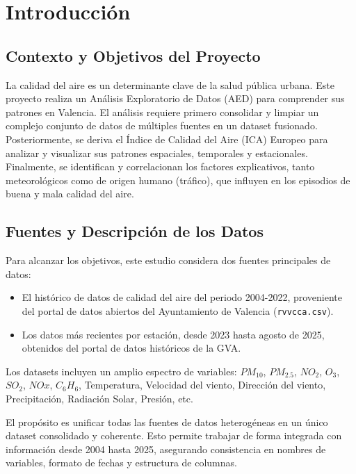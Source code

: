 \documentclass[,,,moreauthors,pdftex]{Definitions/mdpi}
\begin{document}

\section{Introducción}\label{introducciuxf3n}

\subsection{Contexto y Objetivos del
Proyecto}\label{contexto-y-objetivos-del-proyecto}

La calidad del aire es un determinante clave de la salud pública urbana.
Este proyecto realiza un Análisis Exploratorio de Datos (AED) para
comprender sus patrones en Valencia. El análisis requiere primero
consolidar y limpiar un complejo conjunto de datos de múltiples fuentes
en un dataset fusionado. Posteriormente, se deriva el Índice de Calidad
del Aire (ICA) Europeo para analizar y visualizar sus patrones
espaciales, temporales y estacionales. Finalmente, se identifican y
correlacionan los factores explicativos, tanto meteorológicos como de
origen humano (tráfico), que influyen en los episodios de buena y mala
calidad del aire.

\subsection{Fuentes y Descripción de los
Datos}\label{fuentes-y-descripciuxf3n-de-los-datos}

Para alcanzar los objetivos, este estudio considera dos fuentes
principales de datos:

\begin{itemize}
\item
  El histórico de datos de calidad del aire del periodo 2004-2022,
  proveniente del portal de datos abiertos del Ayuntamiento de Valencia
  (\texttt{rvvcca.csv}).
\item
  Los datos más recientes por estación, desde 2023 hasta agosto de 2025,
  obtenidos del portal de datos históricos de la GVA.
\end{itemize}

Los datasets incluyen un amplio espectro de variables: \(PM_{10}\),
\(PM_{2.5}\), \(NO_2\), \(O_3\), \(SO_2\), \(NOx\), \(C_6H_6\),
Temperatura, Velocidad del viento, Dirección del viento, Precipitación,
Radiación Solar, Presión, etc.

El propósito es unificar todas las fuentes de datos heterogéneas en un
único dataset consolidado y coherente. Esto permite trabajar de forma
integrada con información desde 2004 hasta 2025, asegurando consistencia
en nombres de variables, formato de fechas y estructura de columnas.
\end{document}
